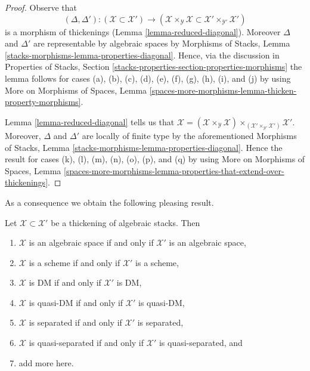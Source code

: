 \begin{proof}
Observe that
$$
(\Delta, \Delta') :
(\mathcal{X} \subset \mathcal{X}')
\longrightarrow
(\mathcal{X} \times_\mathcal{Y} \mathcal{X} \subset
\mathcal{X}' \times_{\mathcal{Y}'} \mathcal{X}')
$$
is a morphism of thickenings (Lemma \ref{lemma-reduced-diagonal}).
Moreover $\Delta$ and $\Delta'$ are
representable by algebraic spaces by
Morphisms of Stacks, Lemma \ref{stacks-morphisms-lemma-properties-diagonal}.
Hence, via the discussion in
Properties of Stacks, Section
\ref{stacks-properties-section-properties-morphisms}
the lemma follows for cases (a), (b), (c), (d),
(e), (f), (g), (h), (i), and (j) by using
More on Morphisms of Spaces, Lemma
\ref{spaces-more-morphisms-lemma-thicken-property-morphisms}.

\medskip\noindent
Lemma \ref{lemma-reduced-diagonal} tells us that
$\mathcal{X} = (\mathcal{X} \times_\mathcal{Y} \mathcal{X})
\times_{(\mathcal{X}' \times_{\mathcal{Y}'} \mathcal{X}')} \mathcal{X}'$.
Moreover, $\Delta$ and $\Delta'$ are locally of finite type by
the aforementioned
Morphisms of Stacks, Lemma \ref{stacks-morphisms-lemma-properties-diagonal}.
Hence the result for cases (k), (l), (m), (n), (o), (p), and (q) by using
More on Morphisms of Spaces, Lemma
\ref{spaces-more-morphisms-lemma-properties-that-extend-over-thickenings}.
\end{proof}

\noindent
As a consequence we obtain the following pleasing result.

\begin{lemma}
\label{lemma-thickening-properties}
\begin{reference}
\cite[Theorem 2.2.5]{Conrad-moduli}
\end{reference}
Let $\mathcal{X} \subset \mathcal{X}'$ be a thickening of algebraic
stacks. Then
\begin{enumerate}
\item $\mathcal{X}$ is an algebraic space if and only if $\mathcal{X}'$
is an algebraic space,
\item $\mathcal{X}$ is a scheme if and only if $\mathcal{X}'$ is a scheme,
\item $\mathcal{X}$ is DM if and only if $\mathcal{X}'$ is DM,
\item $\mathcal{X}$ is quasi-DM if and only if $\mathcal{X}'$ is quasi-DM,
\item $\mathcal{X}$ is separated if and only if $\mathcal{X}'$ is separated,
\item $\mathcal{X}$ is quasi-separated if and only if $\mathcal{X}'$ is
quasi-separated, and
\item add more here.
\end{enumerate}
\end{lemma}

